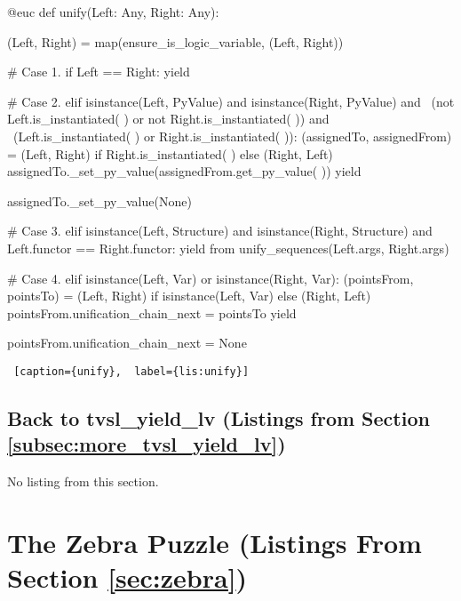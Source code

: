 \begin{minipage}{\linewidth} \hrulefill
\begin{python}[numbers=left]
@euc
def unify(Left: Any, Right: Any):

  (Left, Right) = map(ensure_is_logic_variable, (Left, Right))

  # Case 1.
  if Left == Right:
    yield

  # Case 2.
  elif isinstance(Left, PyValue) and isinstance(Right, PyValue) and \
       (not Left.is_instantiated( ) or not Right.is_instantiated( )) and \
       (Left.is_instantiated( ) or Right.is_instantiated( )):
    (assignedTo, assignedFrom) = (Left, Right) if Right.is_instantiated( ) else (Right, Left)
    assignedTo._set_py_value(assignedFrom.get_py_value( ))
    yield

    assignedTo._set_py_value(None)

  # Case 3.
  elif isinstance(Left, Structure) and isinstance(Right, Structure) and Left.functor == Right.functor:
    yield from unify_sequences(Left.args, Right.args)

  # Case 4.
  elif isinstance(Left, Var) or isinstance(Right, Var):
    (pointsFrom, pointsTo) = (Left, Right) if isinstance(Left, Var) else (Right, Left)
    pointsFrom.unification_chain_next = pointsTo
    yield

    pointsFrom.unification_chain_next = None

\end{python}
\begin{lstlisting} [caption={unify},  label={lis:unify}]
\end{lstlisting}
\end{minipage}

\subsection{Back to tvsl\_yield\_lv (Listings from Section \ref{subsec:more_tvsl_yield_lv})} \label{appsubsec:more_tvsl_yield_lv}

No listing from this section.

\section{The Zebra Puzzle (Listings From Section \ref{sec:zebra})} \label{appsec:zebra}

